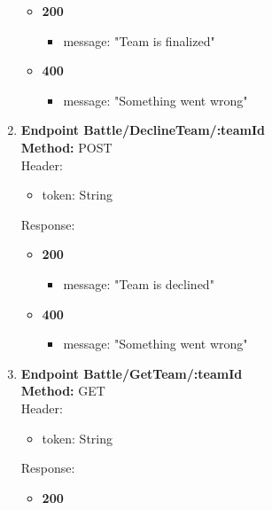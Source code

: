 \begin{enumerate}
\begin{itemize}
        \item \textbf{200} \\
        \begin{itemize}
            \item message: "Team is finalized"
        \end{itemize}
        \item \textbf{400} \\
        \begin{itemize}
            \item message: "Something went wrong"
        \end{itemize}
    \end{itemize}
    \item \textbf{Endpoint Battle/DeclineTeam/:teamId} \\
    \textbf{Method:} POST \\
    Header:\\
    \begin{itemize}
        \item token: String
    \end{itemize}
    Response:\\
    \begin{itemize}
        \item \textbf{200} \\
        \begin{itemize}
            \item message: "Team is declined"
        \end{itemize}
        \item \textbf{400} \\
        \begin{itemize}
            \item message: "Something went wrong"
        \end{itemize}
    \end{itemize}
    \item \textbf{Endpoint Battle/GetTeam/:teamId} \\
    \textbf{Method:} GET \\
    Header:\\
    \begin{itemize}
        \item token: String
    \end{itemize}
    Response:\\
    \begin{itemize}
        \item \textbf{200} \\

\end{itemize}
\end{enumerate}
